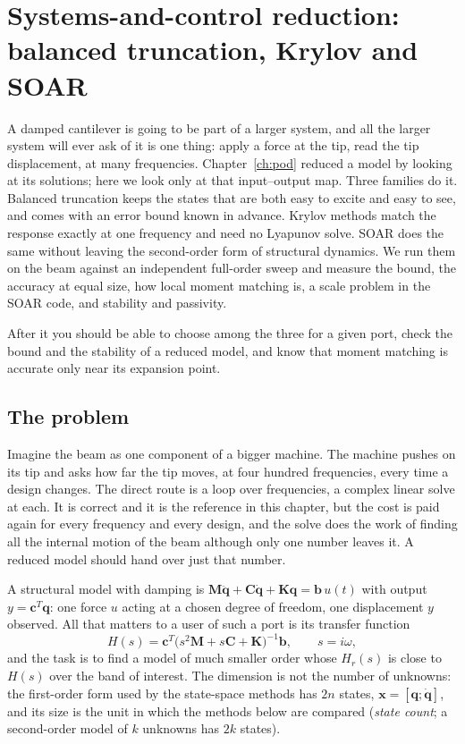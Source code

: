 \chapter{Systems-and-control reduction: balanced truncation, Krylov and SOAR}\label{ch:bt}

\begin{tcolorbox}[colback=gray!5,colframe=gray!50,title={In this chapter}]
A damped cantilever is going to be part of a larger system, and all the larger system will ever ask of it is one thing: apply a force at the tip, read the tip displacement, at many frequencies. Chapter~\ref{ch:pod} reduced a model by looking at its solutions; here we look only at that input--output map. Three families do it. Balanced truncation keeps the states that are both easy to excite and easy to see, and comes with an error bound known in advance. Krylov methods match the response exactly at one frequency and need no Lyapunov solve. SOAR does the same without leaving the second-order form of structural dynamics. We run them on the beam against an independent full-order sweep and measure the bound, the accuracy at equal size, how local moment matching is, a scale problem in the SOAR code, and stability and passivity.\par\smallskip
After it you should be able to choose among the three for a given port, check the bound and the stability of a reduced model, and know that moment matching is accurate only near its expansion point.
\end{tcolorbox}

\section{The problem}\label{sec:bt-problem}

Imagine the beam as one component of a bigger machine. The machine pushes on its tip and asks how far the tip moves, at four hundred frequencies, every time a design changes. The direct route is a loop over frequencies, a complex linear solve at each. It is correct and it is the reference in this chapter, but the cost is paid again for every frequency and every design, and the solve does the work of finding all the internal motion of the beam although only one number leaves it. A reduced model should hand over just that number.

A structural model with damping is $\bm M\ddot{\bm q}+\bm C\dot{\bm q}+\bm K\bm q=\bm b\,u(t)$ with output $y=\bm c^T\bm q$: one force $u$ acting at a chosen degree of freedom, one displacement $y$ observed. All that matters to a user of such a port is its transfer function
\begin{equation}\label{eq:bt-tf}
H(s)=\bm c^T\bigl(s^2\bm M+s\bm C+\bm K\bigr)^{-1}\bm b,\qquad s=i\omega,
\end{equation}
and the task is to find a model of much smaller order whose $H_r(s)$ is close to $H(s)$ over the band of interest. The dimension is not the number of unknowns: the first-order form used by the state-space methods has $2n$ states, $\bm x=[\bm q;\dot{\bm q}]$, and its size is the unit in which the methods below are compared (\emph{state count}; a second-order model of $k$ unknowns has $2k$ states).

